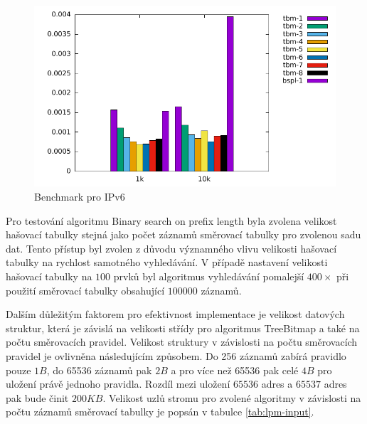 \begin{figure}[!htbp]
	\centering
	\includegraphics[scale=1]{fig/lpm-ipv6.pdf}
	\caption{Benchmark pro IPv6}
    \label{fig:lpm-ipv6}
\end{figure}

Pro testování algoritmu Binary search on prefix length byla zvolena velikost hašovací tabulky
stejná jako počet záznamů směrovací tabulky pro zvolenou sadu dat. Tento přístup byl zvolen z důvodu významného vlivu
velikosti hašovací tabulky na rychlost samotného vyhledávání.
V případě nastavení velikosti hašovací tabulky na $100$ prvků byl algoritmus vyhledávání pomalejší $400\times$
při použití směrovací tabulky obsahující $100 000$ záznamů.


Dalším důležitým faktorem pro efektivnost implementace je velikost datových struktur, která je
závislá na velikosti střídy pro algoritmus TreeBitmap a také na počtu směrovacích pravidel.
Velikost struktury v závislosti na počtu směrovacích pravidel je ovlivněna následujícím způsobem.
Do 256 záznamů zabírá pravidlo pouze $1B$, do 65536 záznamů pak $2B$ a pro více než 65536 pak celé $4B$ pro uložení právě jednoho pravidla. Rozdíl mezi uložení $65536$ adres a $65537$ adres pak bude činit
$200KB$. Velikost uzlů stromu pro zvolené algoritmy v závislosti na počtu záznamů směrovací tabulky
je popsán v tabulce \ref{tab:lpm-input}.


